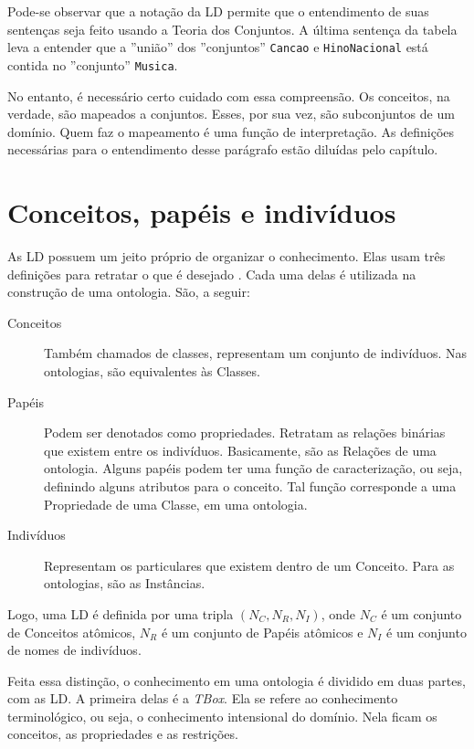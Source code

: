 Pode-se observar que a notação da LD permite que o entendimento de suas sentenças seja feito usando a Teoria dos Conjuntos. A última sentença da tabela leva a entender que a ''união'' dos ''conjuntos'' \texttt{Cancao} e \texttt{HinoNacional} está contida no ''conjunto'' \texttt{Musica}.

No entanto, é necessário certo cuidado com essa compreensão. Os conceitos, na verdade, são mapeados a conjuntos. Esses, por sua vez, são subconjuntos de um domínio. Quem faz o mapeamento é uma função de interpretação. As definições necessárias para o entendimento desse parágrafo estão diluídas pelo capítulo.

\section{Conceitos, papéis e indivíduos}

As LD possuem um jeito próprio de organizar o conhecimento. Elas usam três definições para retratar o que é desejado \citep{logicaMatos}. Cada uma delas é utilizada na construção de uma ontologia. São, a seguir:

\begin{description}
	\item[Conceitos] Também chamados de classes, representam um conjunto de indivíduos. Nas ontologias, são equivalentes às Classes.
	\item[Papéis] Podem ser denotados como propriedades. Retratam as relações binárias que existem entre os indivíduos. Basicamente, são as Relações de uma ontologia. Alguns papéis podem ter uma função de caracterização, ou seja, definindo alguns atributos para o conceito. Tal função corresponde a uma Propriedade de uma Classe, em uma ontologia.
	\item[Indivíduos] Representam os particulares que existem dentro de um Conceito. Para as ontologias, são as Instâncias.
\end{description}

Logo, uma LD é definida por uma tripla $ (N_C, N_R, N_I) $, onde $ N_C $ é um conjunto de Conceitos atômicos, $ N_R $ é um conjunto de Papéis atômicos e $ N_I $ é um conjunto de nomes de indivíduos.

Feita essa distinção, o conhecimento em uma ontologia é dividido em duas partes, com as LD. A primeira delas é a \textit{TBox}. Ela se refere ao conhecimento terminológico, ou seja, o conhecimento intensional do domínio. Nela ficam os conceitos, as propriedades e as restrições.

